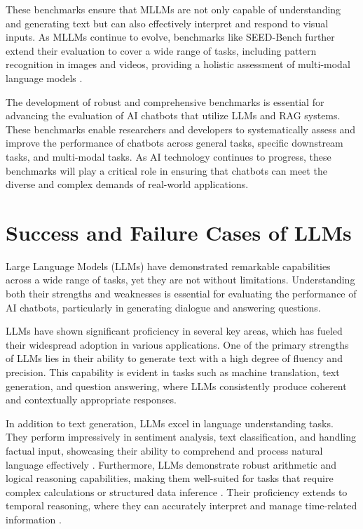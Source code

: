 These benchmarks ensure that MLLMs are not only capable of understanding and generating text but can also effectively interpret and respond to visual inputs. As MLLMs continue to evolve, benchmarks like SEED-Bench further extend their evaluation to cover a wide range of tasks, including pattern recognition in images and videos, providing a holistic assessment of multi-modal language models \cite{li2023seed}. \newline

The development of robust and comprehensive benchmarks is essential for advancing the evaluation of AI chatbots that utilize LLMs and RAG systems. These benchmarks enable researchers and developers to systematically assess and improve the performance of chatbots across general tasks, specific downstream tasks, and multi-modal tasks. As AI technology continues to progress, these benchmarks will play a critical role in ensuring that chatbots can meet the diverse and complex demands of real-world applications.

\section{Success and Failure Cases of LLMs}

Large Language Models (LLMs) have demonstrated remarkable capabilities across a wide range of tasks, yet they are not without limitations. Understanding both their strengths and weaknesses is essential for evaluating the performance of AI chatbots, particularly in generating dialogue and answering questions.

LLMs have shown significant proficiency in several key areas, which has fueled their widespread adoption in various applications. One of the primary strengths of LLMs lies in their ability to generate text with a high degree of fluency and precision. This capability is evident in tasks such as machine translation, text generation, and question answering, where LLMs consistently produce coherent and contextually appropriate responses.

In addition to text generation, LLMs excel in language understanding tasks. They perform impressively in sentiment analysis, text classification, and handling factual input, showcasing their ability to comprehend and process natural language effectively  . Furthermore, LLMs demonstrate robust arithmetic and logical reasoning capabilities, making them well-suited for tasks that require complex calculations or structured data inference  . Their proficiency extends to temporal reasoning, where they can accurately interpret and manage time-related information .

